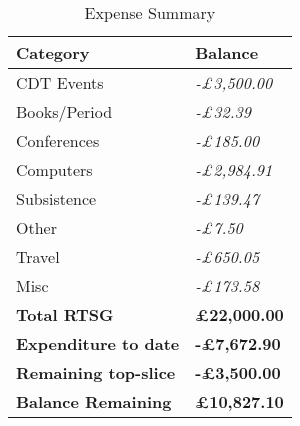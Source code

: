 \begin{table}[ht]
    \centering
    \begin{tabular}{R{4cm} L{4cm}}
        \hline
        \textbf{Category}            & \textbf{Balance}                        \\ \hline
        CDT Events                   & \textit{\color[HTML]{da1a35}-£3,500.00} \\
        Books/Period                 & \textit{\color[HTML]{da1a35}-£32.39}    \\
        Conferences                  & \textit{\color[HTML]{da1a35}-£185.00}   \\
        Computers                    & \textit{\color[HTML]{da1a35}-£2,984.91} \\
        Subsistence                  & \textit{\color[HTML]{da1a35}-£139.47}   \\
        Other                        & \textit{\color[HTML]{da1a35}-£7.50}     \\
        Travel                       & \textit{\color[HTML]{da1a35}-£650.05}   \\
        Misc                         & \textit{\color[HTML]{da1a35}-£173.58}   \\
        \textbf{Total RTSG}          & \textbf{£22,000.00}                     \\ \hline
        \textbf{Expenditure to date} & \textbf{\color[HTML]{da1a35}-£7,672.90} \\
        \textbf{Remaining top-slice} & \textbf{\color[HTML]{da1a35}-£3,500.00} \\ \hline
        \textbf{Balance Remaining}   & \textbf{£10,827.10}                     \\
    \end{tabular}
    \caption{Expense Summary}
    \label{tab:expense_summary}
\end{table}